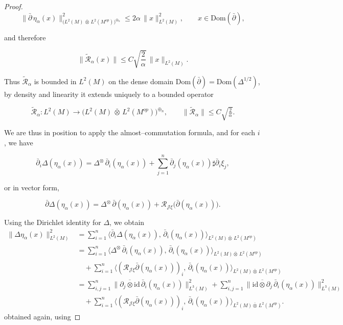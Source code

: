 \documentclass[10pt,a4paper,reqno]{amsart}
\newcommand{\Dom}{\mathrm{Dom}}
\begin{document}
\begin{proof}
\[
\|\bar\partial\,\eta_\alpha(x)\|_{\big(L^2(M)\,\bar\otimes\,L^2(M^{op})\big)^{\oplus_n}}^2 \le 2\alpha\,\|x\|_{L^2(M)}^2,
\qquad x\in \Dom(\bar\partial),
\]



and therefore



\[
\|\tilde{\mathcal R}_\alpha(x)\|
\le
C\sqrt{\frac{2}{\alpha}}\,\|x\|_{L^2(M)}.
\]



Thus $\tilde{\mathcal R}_\alpha$ is bounded in $L^2(M)$ on the dense domain $\Dom(\bar\partial)=\Dom(\Delta^{1/2})$, by density and linearity it extends uniquely to a bounded operator



\[
\tilde{\mathcal R}_\alpha : L^2(M)\longrightarrow \big(L^2(M)\,\bar\otimes\,L^2(M^{op})\big)^{\oplus_n},
\qquad
\|\tilde{\mathcal R}_\alpha\|\le C\sqrt{\tfrac{2}{\alpha}}.
\]




\smallskip

We are thus in position to apply the almost–commutation formula, and for each $i$, we have


\[
\bar\partial_i\Delta(\eta_\alpha(x))
=
\Delta^{\otimes}\,\bar\partial_i(\eta_\alpha(x))
+\sum_{j=1}^n \bar\partial_j(\eta_\alpha(x))\sharp \bar\partial_i\xi_j,
\]


or in vector form,


\[
\bar\partial\Delta(\eta_\alpha(x))
=
\Delta^{\otimes}\,\bar\partial(\eta_\alpha(x))
+\mathcal{R}_{\mathscr{J}\xi}\big(\bar\partial(\eta_\alpha(x))\big).
\]



\smallskip

Using the Dirichlet identity for $\Delta$, we obtain
\begin{align}\label{deltares}
\|\Delta \eta_\alpha(x)\|_{L^2(M)}^2
&=
\sum_{i=1}^n \big\langle \bar\partial_i\Delta(\eta_\alpha(x)),\,\bar\partial_i(\eta_\alpha(x))\big\rangle_{L^2(M){\bar\otimes}\,L^2(M^{op})}\nonumber\\
&=
\sum_{i=1}^n \big\langle \Delta^{\otimes}\,\bar\partial_i(\eta_{\alpha}(x)),\,\bar\partial_i(\eta_{\alpha}(x))\big\rangle_{L^2(M){\bar\otimes}\,L^2(M^{op})}\nonumber\\
&\quad+
\sum_{i=1}^n \big\langle (\mathcal{R}_{\mathscr{J}\xi}\bar\partial(\eta_{\alpha}(x)))_i,\,\bar\partial_i(\eta_{\alpha}(x))\big\rangle_{L^2(M){\bar\otimes}\,L^2(M^{op})}\nonumber\\
&=
\sum_{i,j=1}^n \big\|\overline{\partial_j\otimes \mathrm{id}}\,\bar\partial_i(\eta_{\alpha}(x))\big\|_{L^3(M)}^2
+\sum_{i,j=1}^n \big\|\overline{\mathrm{id}\otimes \partial_j}\,\bar\partial_i(\eta_{\alpha}(x))\big\|_{L^3(M)}^2\nonumber\\
&\quad+
\sum_{i=1}^n \big\langle (\mathcal{R}_{\mathscr{J}\xi}\bar\partial(\eta_{\alpha}(x)))_i,\,\bar\partial_i(\eta_{\alpha}(x))\big\rangle_{L^2(M){\bar\otimes}\,L^2(M^{op})}.
\end{align}
obtained again, using



\end{proof}
\end{document}
